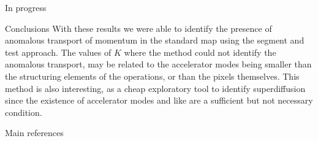 \documentclass[final]{beamer}
\newlength{\colwidth}
\begin{document}
\begin{frame}[t]
\begin{columns}[t]
\begin{column}{\colwidth}
\begin{block}{In progress}
  \end{block}


  \begin{block}{Conclusions}
    With these results we were able to identify the presence of anomalous transport of momentum in the standard map using the segment and test approach. The values of $K$ where the method could not identify the anomalous transport, may be related to the accelerator modes being smaller than the structuring elements of the operations, or than the pixels themselves. This method is also interesting, as a cheap exploratory tool to identify superdiffusion since the existence of accelerator modes and like are a sufficient but not necessary condition. 
    
  \end{block}



  \begin{block}{Main references}

    \nocite{chirikov1979universal,gonzales1987digital,ishizaki1991anomalous,klages2008anomalous}
    \footnotesize{}



  \end{block}

  



\end{column}
\end{columns}
\end{frame}
\end{document}
